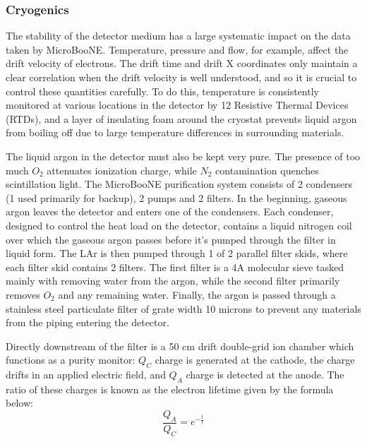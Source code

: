 \subsubsection{Cryogenics}
\par The stability of the detector medium has a large systematic impact on the data taken by MicroBooNE. Temperature, pressure and flow, for example, affect the drift velocity of electrons. The drift time and drift X coordinates only maintain a clear correlation when the drift velocity is well understood, and so it is crucial to control these quantities carefully. To do this, temperature is consistently monitored at various locations in the detector by 12 Resistive Thermal Devices (RTDs), and a layer of insulating foam around the cryostat prevents liquid argon from boiling off due to large temperature differences in surrounding materials.
\par The liquid argon in the detector must also be kept very pure. The presence of too much $O_2$ attenuates ionization charge, while $N_2$ contamination quenches scintillation light. The MicroBooNE purification system consists of 2 condensers (1 used primarily for backup), 2 pumps and 2 filters. In the beginning, gaseous argon leaves the detector and enters one of the condensers. Each condenser, designed to control the heat load on the detector, contains a liquid nitrogen coil over which the gaseous argon passes before it's pumped through the filter in liquid form. The LAr is then pumped through 1 of 2 parallel filter skids, where each filter skid contains 2 filters. The first filter is a 4A molecular sieve tasked mainly with removing water from the argon, while the second filter primarily removes $O_2$ and any remaining water. Finally, the argon is passed through a stainless steel particulate filter of grate width 10 microns to prevent any materials from the piping entering the detector. 
\par Directly downstream of the filter is a 50 cm drift double-grid ion chamber which functions as a purity monitor: $Q_C$ charge is generated at the cathode, the charge drifts in an applied electric field, and $Q_A$ charge is detected at the anode. The ratio of these charges is known as the electron lifetime given by the formula below: 
\begin{equation}
  \frac{Q_A}{Q_C} = e^{-\frac{t}{\tau}} 
\end{equation}

